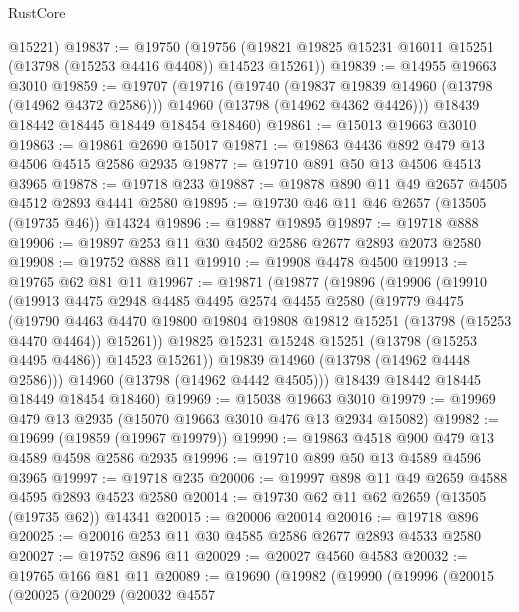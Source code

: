 \begin{lexlean}{RustCore}
\begin{coremodule}
      @15221)
@19837 := @19750
    (@19756 (@19821 @19825 @15231 @16011 @15251 (@13798 (@15253 @4416 @4408)) @14523 @15261))
@19839 := @14955 @19663 @3010
@19859 := @19707
    (@19716
      (@19740
        (@19837 @19839 @14960 (@13798 (@14962 @4372 @2586)))
        @14960
        (@13798 (@14962 @4362 @4426)))
      @18439
      @18442
      @18445
      @18449
      @18454
      @18460)
@19861 := @15013 @19663 @3010
@19863 := @19861 @2690 @15017
@19871 := @19863 @4436 @892 @479 @13 @4506 @4515 @2586 @2935
@19877 := @19710 @891 @50 @13 @4506 @4513 @3965
@19878 := @19718 @233
@19887 := @19878 @890 @11 @49 @2657 @4505 @4512 @2893 @4441 @2580
@19895 := @19730 @46 @11 @46 @2657 (@13505 (@19735 @46)) @14324
@19896 := @19887 @19895
@19897 := @19718 @888
@19906 := @19897 @253 @11 @30 @4502 @2586 @2677 @2893 @2073 @2580
@19908 := @19752 @888 @11
@19910 := @19908 @4478 @4500
@19913 := @19765 @62 @81 @11
@19967 := @19871
    (@19877
      (@19896
        (@19906
          (@19910
            (@19913
              @4475
              @2948
              @4485
              @4495
              @2574
              @4455
              @2580
              (@19779
                @4475
                (@19790
                  @4463
                  @4470
                  @19800
                  @19804
                  @19808
                  @19812
                  @15251
                  (@13798 (@15253 @4470 @4464))
                  @15261))
              @19825
              @15231
              @15248
              @15251
              (@13798 (@15253 @4495 @4486))
              @14523
              @15261))
          @19839
          @14960
          (@13798 (@14962 @4448 @2586)))
        @14960
        (@13798 (@14962 @4442 @4505)))
      @18439
      @18442
      @18445
      @18449
      @18454
      @18460)
@19969 := @15038 @19663 @3010
@19979 := @19969 @479 @13 @2935 (@15070 @19663 @3010 @476 @13 @2934 @15082)
@19982 := @19699 (@19859 (@19967 @19979))
@19990 := @19863 @4518 @900 @479 @13 @4589 @4598 @2586 @2935
@19996 := @19710 @899 @50 @13 @4589 @4596 @3965
@19997 := @19718 @235
@20006 := @19997 @898 @11 @49 @2659 @4588 @4595 @2893 @4523 @2580
@20014 := @19730 @62 @11 @62 @2659 (@13505 (@19735 @62)) @14341
@20015 := @20006 @20014
@20016 := @19718 @896
@20025 := @20016 @253 @11 @30 @4585 @2586 @2677 @2893 @4533 @2580
@20027 := @19752 @896 @11
@20029 := @20027 @4560 @4583
@20032 := @19765 @166 @81 @11
@20089 := @19690
    (@19982
      (@19990
        (@19996
          (@20015
            (@20025
              (@20029
                (@20032
                  @4557

\end{coremodule}
\end{lexlean}
